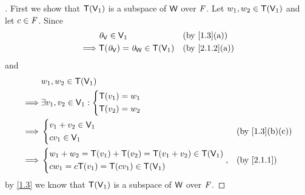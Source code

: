 \begin{proof}[]
  First we show that \(\mathsf{T}(\mathsf{V}_1)\) is a subspace of \(\mathsf{W}\) over \(\mathit{F}\).
  Let \(w_1, w_2 \in \mathsf{T}(\mathsf{V}_1)\) and let \(c \in \mathit{F}\).
  Since
  \begin{align*}
             & \zv_{\V} \in \V_1                    &  & \text{(by \cref{1.3}(a))}   \\
    \implies & \T(\zv_{\V}) = \zv_{\W} \in \T(\V_1) &  & \text{(by \cref{2.1.2}(a))}
  \end{align*}
  and
  \begin{align*}
             & w_1, w_2 \in \T(\V_1)                                                                  \\
    \implies & \exists v_1, v_2 \in \V_1 : \begin{dcases}
                                             \T(v_1) = w_1 \\
                                             \T(v_2) = w_2
                                           \end{dcases}                                              \\
    \implies & \begin{dcases}
                 v_1 + v_2 \in \V_1 \\
                 c v_1 \in \V_1
               \end{dcases}                                         &  & \text{(by \cref{1.3}(b)(c))} \\
    \implies & \begin{dcases}
                 w_1 + w_2 = \T(v_1) + \T(v_2) = \T(v_1 + v_2) \in \T(\V_1) \\
                 c w_1 = c \T(v_1) = \T(c v_1) \in \T(\V_1)
               \end{dcases}, &  & \text{(by \cref{2.1.1})}
  \end{align*}
  by \cref{1.3} we know that \(\mathsf{T}(\mathsf{V}_1)\) is a subspace of \(\mathsf{W}\) over \(\mathit{F}\).


\end{proof}
